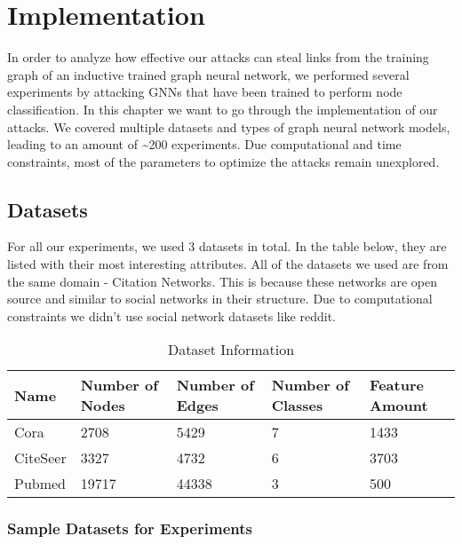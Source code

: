 \chapter{Implementation}

  In order to analyze how effective our attacks can steal links from the training graph of an inductive trained graph neural network, we performed several experiments by attacking GNNs that have been trained to perform node classification.
  In this chapter we want to go through the implementation of our attacks.
  We covered multiple datasets and types of graph neural network models, leading to an amount of \textasciitilde200 experiments.
  Due computational and time constraints, most of the parameters to optimize the attacks remain unexplored.

  \section{Datasets}

    For all our experiments, we used 3 datasets in total.
    In the table below, they are listed with their most interesting attributes.
    All of the datasets we used are from the same domain - Citation Networks.
    This is because these networks are open source and similar to social networks in their structure.
    Due to computational constraints we didn't use social network datasets like reddit.

    \vspace{0.48cm}
    \begin{table}[!h]
      \centering
      \footnotesize
      \begin{tabular}{l|l|l|l|l}
        \toprule
        Name & Number of Nodes & Number of Edges & Number of Classes & Feature Amount \\
        \midrule
        Cora & 2708            & 5429            & 7                 & 1433 \\
        CiteSeer & 3327        & 4732            & 6                 & 3703 \\
        Pubmed & 19717         & 44338           & 3                 & 500 \\
        \bottomrule
      \end{tabular}
      \caption{Dataset Information}
      \label{table:datasets}
    \end{table}

    \subsection*{Sample Datasets for Experiments}

